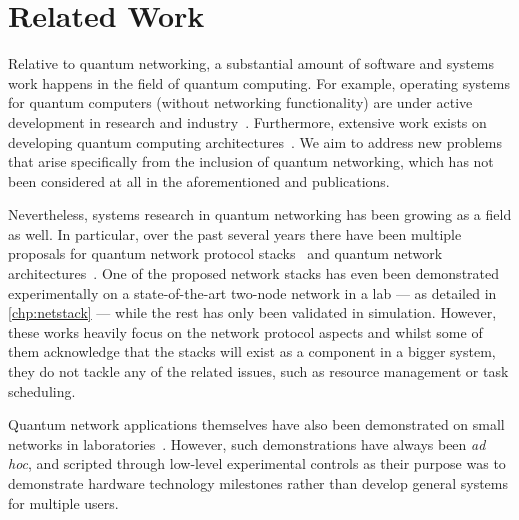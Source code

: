 \section{Related Work}
\label{sec:qnodeos:relwork}

Relative to quantum networking, a substantial amount of software and systems work happens in the
field of quantum computing. For example, operating systems for quantum computers (without networking
functionality) are under active development in research and industry~\cite{kong_2021_origin,
deltaflow_os}. Furthermore, extensive work exists on developing quantum computing
architectures~\cite{fu_2017_microarch, murali_2019_fullstack, bourassa_2021_blueprint}. We aim to
address new problems that arise specifically from the inclusion of quantum networking, which has not
been considered at all in the aforementioned  and publications.

Nevertheless, systems research in quantum networking has been growing as a field as well. In
particular, over the past several years there have been multiple proposals for quantum network
protocol stacks~\cite{van_meter_2013_repeaters, pirker_2019_quantum, dahlberg_2019_egp,
illiano_2022_quantum} and quantum network architectures~\cite{matsuo_2019_bootstrapping,
aguado_2020_enabling, li_2022_connectionless, diadamo_2022_packet, pouryousef_2022_overlay,
gu_2023_fendi, mandil_2023_packet}. One of the proposed network stacks has even been demonstrated
experimentally on a state-of-the-art two-node network in a lab --- as detailed in
\cref{chp:netstack} --- while the rest has only been validated in simulation. However, these works
heavily focus on the network protocol aspects and whilst some of them acknowledge that the stacks
will exist as a component in a bigger system, they do not tackle any of the related issues, such as
resource management or task scheduling.

Quantum network applications themselves have also been demonstrated on small networks in
laboratories~\cite{barz_2012_demonstration}. However, such demonstrations have always been \emph{ad
hoc}, and scripted through low-level experimental controls as their purpose was to demonstrate
hardware technology milestones rather than develop general systems for multiple users.

\begin{xstretch}
\printbibliography[heading=subbibintoc,title={References},notcategory=noprint]
\end{xstretch}
